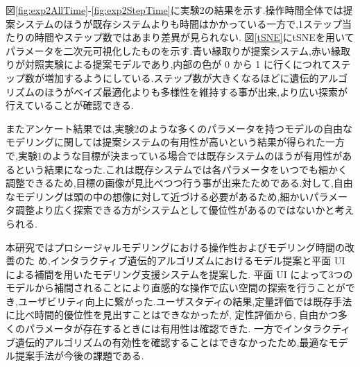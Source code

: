 \documentclass[a4j,11pt]{article}
\begin{document}
図\ref{fig:exp2AllTime}-\ref{fig:exp2StepTime}に実験2の結果を示す.操作時間全体では提案システムのほうが既存システムよりも時間はかかっている一方で,1ステップ当たりの時間やステップ数ではあまり差異が見られない.
図\ref{tSNE}にtSNEを用いてパラメータを二次元可視化したものを示す.青い縁取りが提案システム,赤い縁取りが対照実験による提案モデルであり,内部の色が 0 から 1 に行くにつれてステップ数が増加するようにしている.ステップ数が大きくなるほどに遺伝的アルゴリズムのほうがベイズ最適化よりも多様性を維持する事が出来,より広い探索が行えていることが確認できる.


またアンケート結果では,実験2のような多くのパラメータを持つモデルの自由なモデリングに関しては提案システムの有用性が高いという結果が得られた一方で,実験1のような目標が決まっている場合では既存システムのほうが有用性があるという結果になった.これは既存システムでは各パラメータをいつでも細かく調整できるため,目標の画像が見比べつつ行う事が出来たためである.対して,自由なモデリングは頭の中の想像に対して近づける必要があるため,細かいパラメータ調整より広く探索できる方がシステムとして優位性があるのではないかと考えられる.

\vspace{0.5mm}

\noindent{\bf [結論, Conclusions]}
\indent
本研究ではプロシージャルモデリングにおける操作性およびモデリング時間の改善のた
め,インタラクティブ遺伝的アルゴリズムにおけるモデル提案と平面 UI による補間を用いたモデリング支援システムを提案した.
平面 UI によって3つのモデルから補間されることにより直感的な操作で広い空間の探索を行うことができ,ユーザビリティ向上に繋がった.ユーザスタディの結果,定量評価では既存手法に比べ時間的優位性を見出すことはできなかったが, 定性評価から, 自由かつ多くのパラメータが存在するときには有用性は確認できた. 一方でインタラクティブ遺伝的アルゴリズムの有効性を確認することはできなかったため,最適なモデル提案手法が今後の課題である.

\vspace{1.5mm}
\end{document}
